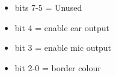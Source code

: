 \begin{itemize}
\item[] bits 7-5 = Unused
\item[] bit 4 = enable ear output 
\item[] bit 3 = enable mic output
\item[] bit 2-0 = border colour 
\end{itemize}
